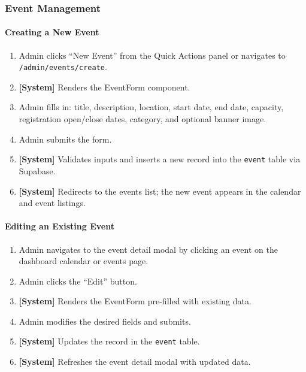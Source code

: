 \documentclass[11pt,a4paper]{article}
\begin{document}
\subsubsection{Event Management}

\paragraph{Creating a New Event}
\begin{enumerate}[leftmargin=1.5em]
  \item Admin clicks ``New Event'' from the Quick Actions panel or navigates to \texttt{/admin/events/create}.
  \item \textbf{[System]} Renders the EventForm component.
  \item Admin fills in: title, description, location, start date, end date, capacity, registration open/close dates, category, and optional banner image.
  \item Admin submits the form.
  \item \textbf{[System]} Validates inputs and inserts a new record into the \texttt{event} table via Supabase.
  \item \textbf{[System]} Redirects to the events list; the new event appears in the calendar and event listings.
\end{enumerate}

\paragraph{Editing an Existing Event}
\begin{enumerate}[leftmargin=1.5em]
  \item Admin navigates to the event detail modal by clicking an event on the dashboard calendar or events page.
  \item Admin clicks the ``Edit'' button.
  \item \textbf{[System]} Renders the EventForm pre-filled with existing data.
  \item Admin modifies the desired fields and submits.
  \item \textbf{[System]} Updates the record in the \texttt{event} table.
  \item \textbf{[System]} Refreshes the event detail modal with updated data.
\end{enumerate}
\end{document}
